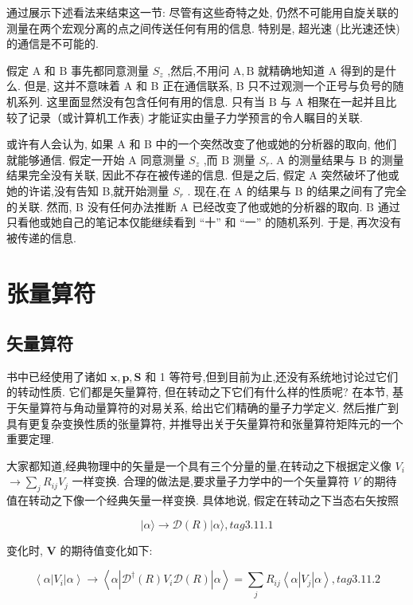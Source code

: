 通过展示下述看法来结束这一节: 尽管有这些奇特之处, 仍然不可能用自旋关联的测量在两个宏观分离的点之间传送任何有用的信息. 特别是, 超光速 (比光速还快) 的通信是不可能的.

假定 $\mathrm{A}$ 和 $\mathrm{B}$ 事先都同意测量 ${S}_{z}$ ,然后,不用问 $\mathrm{A},\mathrm{B}$ 就精确地知道 $\mathrm{A}$ 得到的是什么. 但是, 这并不意味着 A 和 B 正在通信联系, B 只不过观测一个正号与负号的随机系列. 这里面显然没有包含任何有用的信息. 只有当 $\mathrm{B}$ 与 $\mathrm{A}$ 相聚在一起并且比较了记录（或计算机工作表) 才能证实由量子力学预言的令人瞩目的关联.

或许有人会认为, 如果 A 和 B 中的一个突然改变了他或她的分析器的取向, 他们就能够通信. 假定一开始 $\mathrm{A}$ 同意测量 ${S}_{z}$ ,而 $\mathrm{B}$ 测量 ${S}_{r}.\mathrm{\;A}$ 的测量结果与 $\mathrm{B}$ 的测量结果完全没有关联, 因此不存在被传递的信息. 但是之后, 假定 $\mathrm{A}$ 突然破坏了他或她的许诺,没有告知 B,就开始测量 ${S}_{r}$ . 现在,在 A 的结果与 B 的结果之间有了完全的关联. 然而, B 没有任何办法推断 $\mathrm{A}$ 已经改变了他或她的分析器的取向. $\mathrm{B}$ 通过只看他或她自己的笔记本仅能继续看到 “十” 和 “一” 的随机系列. 于是, 再次没有被传递的信息.

\section{张量算符}
\subsection{矢量算符}

书中已经使用了诸如 $\mathbf{x},\mathbf{p},\mathbf{S}$ 和 1 等符号,但到目前为止,还没有系统地讨论过它们的转动性质. 它们都是矢量算符, 但在转动之下它们有什么样的性质呢? 在本节, 基于矢量算符与角动量算符的对易关系, 给出它们精确的量子力学定义. 然后推广到具有更复杂变换性质的张量算符, 并推导出关于矢量算符和张量算符矩阵元的一个重要定理.

大家都知道,经典物理中的矢量是一个具有三个分量的量,在转动之下根据定义像 ${V}_{i}$ $\rightarrow \mathop{\sum }\limits_{j}{R}_{ij}{V}_{j}$ 一样变换. 合理的做法是,要求量子力学中的一个矢量算符 $V$ 的期待值在转动之下像一个经典矢量一样变换. 具体地说, 假定在转动之下当态右矢按照

$$
\left| {\alpha \rangle \rightarrow \mathcal{D}\left( R\right) }\right| \alpha \rangle , tag{3.11.1}
$$

变化时, $\mathbf{V}$ 的期待值变化如下:

$$
\left\langle {\alpha \left| {V}_{i}\right| \alpha }\right\rangle \rightarrow \left\langle {\alpha \left| {{\mathcal{D}}^{ \dagger }\left( R\right) {V}_{i}\mathcal{D}\left( R\right) }\right| \alpha }\right\rangle = \mathop{\sum }\limits_{j}{R}_{ij}\left\langle {\alpha \left| {V}_{j}\right| \alpha }\right\rangle , tag{3.11.2}
$$

